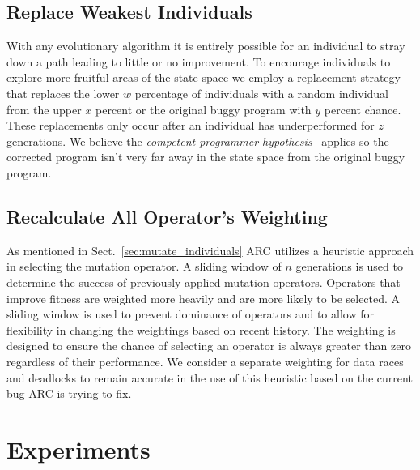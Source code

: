 \documentclass{llncs}
\begin{document}
\subsection{Replace Weakest Individuals}
\label{sec:replace_weakest_individuals}

With any evolutionary algorithm it is entirely possible for an individual to
stray down a path leading to little or no improvement. To encourage individuals
to explore more fruitful areas of the state space we employ a replacement
strategy that replaces the lower $w$ percentage of individuals with a random
individual from the upper $x$ percent or the original buggy program with $y$ percent chance.
These replacements only occur after an
individual has underperformed for $z$ generations. We believe the
\textit{competent programmer hypothesis}~\cite{ABD+79} applies so the corrected
program isn't very far away in the state space from the original buggy program.

\subsection{Recalculate All Operator's Weighting}
\label{sec:recalculate_operator_weighting}

As mentioned in Sect.~\ref{sec:mutate_individuals} ARC utilizes a heuristic approach in selecting the mutation operator. A sliding window of $n$ generations is used to determine the
success of previously applied mutation operators. Operators that improve fitness
are weighted more heavily and are more likely to be selected. A sliding window
is used to prevent dominance of operators and to allow for flexibility in
changing the weightings based on recent history. The weighting is designed to ensure
the chance of selecting an operator is always greater than zero regardless of their performance.
We consider a separate weighting for data races and deadlocks to remain accurate in the use of this heuristic based on the current bug ARC is trying to fix.

\section{Experiments}
\label{sec:experiments}
\end{document}
